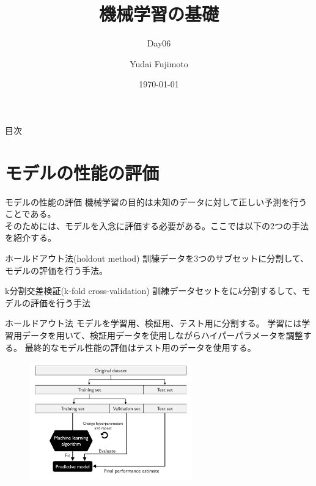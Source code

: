 \documentclass[aspectratio=169, dvipdfmx, 11pt]{beamer} %
\title[Day06]{機械学習の基礎}
\subtitle{Day06}
\author[Yudai Fujimoto]{Yudai Fujimoto}
\institute[SUS]{Suwa University of Science}
\date{\today}
\begin{document}
\maketitle

\begin{frame}{目次}
    \tableofcontents
\end{frame}

\section{モデルの性能の評価}
\begin{frame}{モデルの性能の評価}
    機械学習の目的は未知のデータに対して正しい予測を行うことである。\\
    そのためには、モデルを入念に評価する必要がある。ここでは以下の2つの手法を紹介する。
    \vspace{1em}
    \begin{alertblock}{ホールドアウト法(holdout method)}
        訓練データを3つのサブセットに分割して、モデルの評価を行う手法。
    \end{alertblock}
    \vspace{1em}
    \begin{exampleblock}{k分割交差検証(k-fold cross-validation)}
        訓練データセットをに\(k\)分割するして、モデルの評価を行う手法
    \end{exampleblock}
\end{frame}

\begin{frame}{ホールドアウト法}
    モデルを学習用、検証用、テスト用に分割する。
    学習には学習用データを用いて、検証用データを使用しながらハイパーパラメータを調整する。
    最終的なモデル性能の評価はテスト用のデータを使用する。
    \vspace{1em}
    \begin{figure}[b]
        \begin{center}
        \includegraphics[width=70mm]{img/day06/fig01.png}
        \end{center}
    \end{figure}
\end{frame}
\end{document}
